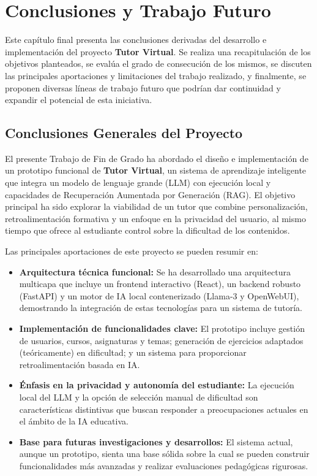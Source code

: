 \chapter{Conclusiones y Trabajo Futuro}
\label{chap:conclusiones}
\justifying

Este capítulo final presenta las conclusiones derivadas del desarrollo e implementación del proyecto \textbf{Tutor Virtual}. Se realiza una recapitulación de los objetivos planteados, se evalúa el grado de consecución de los mismos, se discuten las principales aportaciones y limitaciones del trabajo realizado, y finalmente, se proponen diversas líneas de trabajo futuro que podrían dar continuidad y expandir el potencial de esta iniciativa.

\section{Conclusiones Generales del Proyecto}
\label{sec:conclusiones_generales}

El presente Trabajo de Fin de Grado ha abordado el diseño e implementación de un prototipo funcional de \textbf{Tutor Virtual}, un sistema de aprendizaje inteligente que integra un modelo de lenguaje grande (LLM) con ejecución local y capacidades de Recuperación Aumentada por Generación (RAG). El objetivo principal ha sido explorar la viabilidad de un tutor que combine personalización, retroalimentación formativa y un enfoque en la privacidad del usuario, al mismo tiempo que ofrece al estudiante control sobre la dificultad de los contenidos.

Las principales aportaciones de este proyecto se pueden resumir en:
\begin{itemize}
    \item \textbf{Arquitectura técnica funcional:} Se ha desarrollado una arquitectura multicapa que incluye un frontend interactivo (React), un backend robusto (FastAPI) y un motor de IA local contenerizado (Llama-3 y OpenWebUI), demostrando la integración de estas tecnologías para un sistema de tutoría.
    \item \textbf{Implementación de funcionalidades clave:} El prototipo incluye gestión de usuarios, cursos, asignaturas y temas; generación de ejercicios adaptados (teóricamente) en dificultad; y un sistema para proporcionar retroalimentación basada en IA.
    \item \textbf{Énfasis en la privacidad y autonomía del estudiante:} La ejecución local del LLM y la opción de selección manual de dificultad son características distintivas que buscan responder a preocupaciones actuales en el ámbito de la IA educativa.
    \item \textbf{Base para futuras investigaciones y desarrollos:} El sistema actual, aunque un prototipo, sienta una base sólida sobre la cual se pueden construir funcionalidades más avanzadas y realizar evaluaciones pedagógicas rigurosas.
\end{itemize}

